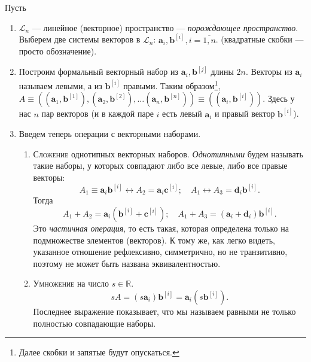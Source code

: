 %	
\begin{definition}[геометрическое]
	Пусть
	\begin{enumerate}
		\item $\mathcal{L}_n$ --- линейное (векторное) пространство --- \emph{порождающее пространство}.
		Выберем две системы векторов в $\mathcal{L}_n$: $\mathbf{a}_i, \mathbf{b}^{[i]}, i = \overline{1, n}$.
		(квадратные скобки --- просто обозначение).
		
		\item Построим формальный векторный набор из $\mathbf{a}_i,
		\mathbf{b}^{[j]}$ длины $2n$.
		Векторы из $\mathbf{a}_i$ называем левыми, а из $\mathbf{b}^{[i]}$
		правыми. Таким образом\footnote{Далее скобки и запятые будут опускаться.}, 
		$A \equiv ((\mathbf{a}_1, \mathbf{b}^{[1]}), (\mathbf{a}_2,
		\mathbf{b}^{[2]}), \dots (\mathbf{a}_n, \mathbf{b}^{[n]}))
		\equiv ((\mathbf{a}_i, \mathbf{b}^{[i]}))$.
		Здесь у нас $ n $ пар векторов (и в каждой паре $ i $ есть левый $\mathbf{a}_i$ и правый вектор
		$\mathbf{b}^{[i]}$).
		
		\item Введем теперь операции с векторными наборами.
		\begin{enumerate}
			\item \textsc{Сложение} однотипных векторных наборов. \emph{Однотипными} будем называть такие наборы, у 
			которых совпадают либо все левые, либо все правые векторы:
			\[
			A_1 \equiv \mathbf{a}_i \mathbf{b}^{[i]} \leftrightarrow A_2 = \mathbf{a}_i \mathbf{c}^{[i]}; 
			\quad
			A_1 \leftrightarrow A_3 = \mathbf{d}_i \mathbf{b}^{[i]}.
			\]
			Тогда
			\[
			A_1+A_2 = \mathbf{a}_i (\mathbf{b}^{[i]} + \mathbf{c}^{[i]}); \quad
			A_1+A_3 = (\mathbf{a}_i + \mathbf{d}_i) \mathbf{b}^{[i]}.
			\]
      Это \emph{частичная операция}, то есть такая, которая определена только на
			подмножестве элементов (векторов). К тому же, как легко видеть, указанное
      отношение рефлексивно,
			симметрично, но не транзитивно, поэтому не может быть названа
			эквивалентностью.
			
			\item \textsc{Умножение} на число $s \in \mathbb{R}$.
			\[
			sA = (s \mathbf{a}_i) \mathbf{b}^{[i]} = \mathbf{a}_i (s \mathbf{b}^{[i]}).
			\]
			Последнее выражение показывает, что мы называем равными не только
			полностью совпадающие наборы.
			

\end{enumerate}
\end{enumerate}
\end{definition}
